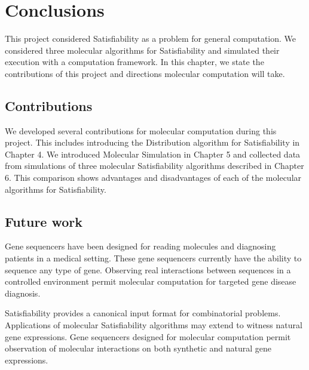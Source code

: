 \chapter{Conclusions}

This project considered {\sc Satisfiability} as a problem for general computation.  We considered three molecular algorithms for {\sc Satisfiability} and simulated their execution with a computation framework.  In this chapter, we state the contributions of this project and directions molecular computation will take.
	
	\section{Contributions}

We developed several contributions for molecular computation during this project.  This includes introducing the Distribution algorithm for {\sc Satisfiability} in Chapter 4.  We introduced Molecular Simulation in Chapter 5 and collected data from simulations of three molecular {\sc Satisfiability} algorithms described in Chapter 6.  This comparison shows advantages and disadvantages of each of the molecular algorithms for {\sc Satisfiability}.


	\section{Future work}
	
Gene sequencers have been designed for reading molecules and diagnosing patients in a medical setting.  These gene sequencers currently have the ability to sequence any type of gene.  Observing real interactions between sequences in a controlled environment permit molecular computation for targeted gene disease diagnosis.

{\sc Satisfiability} provides a canonical input format for combinatorial problems.  Applications of molecular {\sc Satisfiability} algorithms may extend to witness natural gene expressions.  Gene sequencers designed for molecular computation permit observation of molecular interactions on both synthetic and natural gene expressions. 



